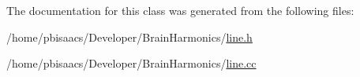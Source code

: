The documentation for this class was generated from the following files\+:\begin{DoxyCompactItemize}
\item 
/home/pbisaacs/\+Developer/\+Brain\+Harmonics/\mbox{\hyperlink{line_8h}{line.\+h}}\item 
/home/pbisaacs/\+Developer/\+Brain\+Harmonics/\mbox{\hyperlink{line_8cc}{line.\+cc}}\end{DoxyCompactItemize}
